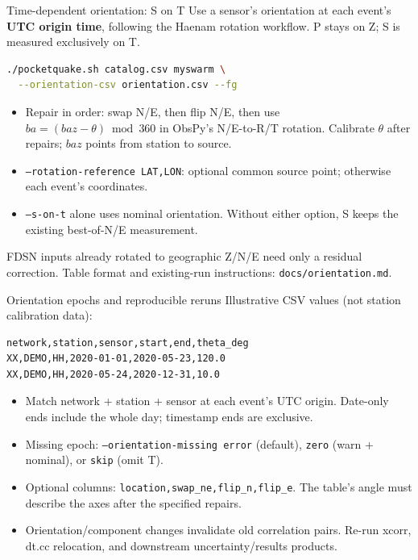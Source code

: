 \documentclass[10pt,aspectratio=169]{beamer}
\begin{document}
\begin{frame}[fragile]{Time-dependent orientation: S on T}
\small
Use a sensor's orientation at each event's \textbf{UTC origin time}, following the
Haenam rotation workflow. P stays on Z; S is measured exclusively on T.
\begin{lstlisting}[language=bash]
./pocketquake.sh catalog.csv myswarm \
  --orientation-csv orientation.csv --fg
\end{lstlisting}
\begin{itemize}
  \setlength{\itemsep}{1pt}
  \item Repair in order: swap N/E, then flip N/E, then use
        $ba=(baz-\theta)\bmod 360$ in ObsPy's N/E-to-R/T rotation.
        Calibrate $\theta$ after repairs; $baz$ points from station to source.
  \item \texttt{--rotation-reference LAT,LON}: optional common source point;
        otherwise each event's coordinates.
  \item \texttt{--s-on-t} alone uses nominal orientation. Without either option,
        S keeps the existing best-of-N/E measurement.
\end{itemize}
{\footnotesize FDSN inputs already rotated to geographic Z/N/E need only a residual
correction. Table format and existing-run instructions: \texttt{docs/orientation.md}.}
\end{frame}

\begin{frame}[fragile]{Orientation epochs and reproducible reruns}
\small
Illustrative CSV values (not station calibration data):
\begin{lstlisting}
network,station,sensor,start,end,theta_deg
XX,DEMO,HH,2020-01-01,2020-05-23,120.0
XX,DEMO,HH,2020-05-24,2020-12-31,10.0
\end{lstlisting}
\begin{itemize}
  \item Match network + station + sensor at each event's UTC origin.
        Date-only ends include the whole day; timestamp ends are exclusive.
  \item Missing epoch: \texttt{--orientation-missing error} (default),
        \texttt{zero} (warn + nominal), or \texttt{skip} (omit T).
  \item Optional columns: \texttt{location,swap\_ne,flip\_n,flip\_e}.
        The table's angle must describe the axes after the specified repairs.
  \item Orientation/component changes invalidate old correlation pairs.
        Re-run xcorr, dt.cc relocation, and downstream uncertainty/results products.
\end{itemize}
\end{frame}
\end{document}
